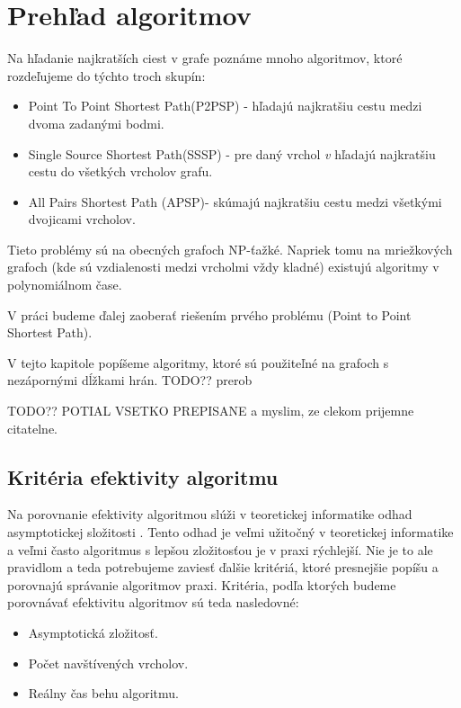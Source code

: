 \chapter{Prehľad algoritmov}
Na hľadanie najkratších ciest v grafe poznáme mnoho algoritmov, ktoré rozdeľujeme do týchto troch \cite{mares07} skupín: 


\begin{itemize}
\item Point To Point Shortest Path(P2PSP) - hľadajú najkratšiu cestu medzi dvoma zadanými bodmi.
\item Single Source Shortest Path(SSSP) - pre daný vrchol {\sl v} hľadajú najkratšiu cestu do všetkých vrcholov grafu.
\item All Pairs Shortest Path (APSP)- skúmajú najkratšiu cestu medzi všetkými dvojicami vrcholov.
\end{itemize}

Tieto problémy sú na obecných grafoch NP-ťažké.
Napriek tomu na mriežkových grafoch (kde sú vzdialenosti medzi vrcholmi vždy kladné) existujú algoritmy v polynomiálnom čase.

V práci budeme ďalej zaoberať riešením prvého problému (Point to Point Shortest Path). 

V tejto kapitole popíšeme algoritmy, ktoré sú použiteľné na grafoch s nezápornými dĺžkami hrán. TODO?? prerob

TODO?? POTIAL VSETKO PREPISANE a myslim, ze clekom prijemne citatelne.


\section{Kritéria efektivity algoritmu}
Na porovnanie efektivity algoritmou slúži v teoretickej informatike odhad asymptotickej složitosti \cite{asymptotic65}.
Tento odhad je veľmi užitočný v teoretickej informatike a veľmi často algoritmus s lepšou zložitosťou je v praxi rýchlejší.
Nie je to ale pravidlom a teda potrebujeme zaviesť ďalšie kritériá, ktoré presnejšie popíšu a porovnajú správanie algoritmov praxi.
Kritéria, podľa ktorých budeme porovnávať efektivitu algoritmov sú teda nasledovné:
\begin{itemize}
	\item Asymptotická zložitosť.
	\item Počet navštívených vrcholov.
	\item Reálny čas behu algoritmu.
\end{itemize}



